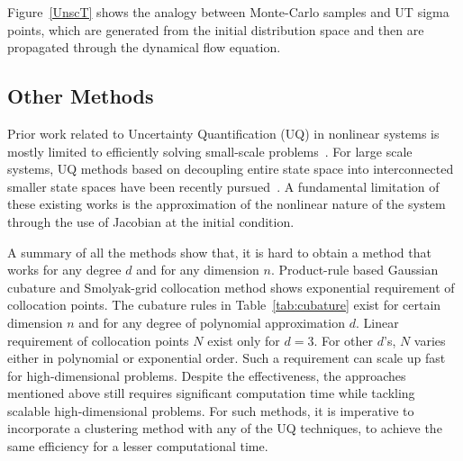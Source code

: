 Figure~\ref{UnscT} shows the analogy between Monte-Carlo samples and UT sigma points, which are generated from the initial distribution space and then are propagated through the dynamical flow equation.

\subsection{Other Methods}

Prior work related to Uncertainty Quantification (UQ) in nonlinear systems is mostly limited to efficiently solving small-scale problems~\cite{mezic2008uncertainty,demars2013entropy,fujimoto2012analytical}. For large scale systems, UQ methods based on decoupling entire state space into interconnected smaller state spaces 
have been recently pursued~\cite{callier1976input,georgiou1992linear,varigonda2004graph,dellnitz2003congestion,surana2012iterative}. A fundamental limitation of these existing works is the approximation of the nonlinear nature of the system through the use of Jacobian at the initial condition.

A summary of all the methods show that, it is hard to obtain a method that works for any degree $d$ and for any dimension $n$. Product-rule based Gaussian cubature and Smolyak-grid collocation method shows exponential requirement of collocation points. The cubature rules in Table~\ref{tab:cubature} exist for certain dimension $n$ and for any degree of polynomial approximation $d$. Linear requirement of collocation points $N$ exist only for $d=3$. For other $d$'s, $N$ varies either in polynomial or exponential order. Such a requirement can scale up fast for high-dimensional problems.
Despite the effectiveness, the approaches mentioned above still requires significant computation time while tackling scalable high-dimensional problems. For such methods, it is imperative to incorporate a clustering method with any of the UQ techniques, to achieve the same efficiency for a lesser computational time. 